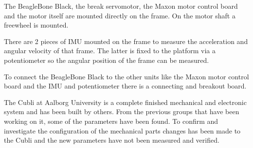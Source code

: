 The BeagleBone Black, the break servomotor, the Maxon motor control board and the motor itself are mounted directly on the frame. On the motor shaft a freewheel is mounted. 

There are 2 pieces of IMU mounted on the frame to measure the acceleration and angular velocity of that frame. The latter is fixed to the platform via a potentiometer so the angular position of the frame can be measured.

To connect the BeagleBone Black to the other units like the Maxon motor control board and the IMU and potentiometer there is a connecting and breakout board.

The Cubli at Aalborg University is a complete finished mechanical and electronic system and has been built by others. From the previous groups that have been working on it, some of the parameters have been found. To confirm and investigate the configuration of the mechanical parts changes has been made to the Cubli and the new parameters have not been measured and verified.

